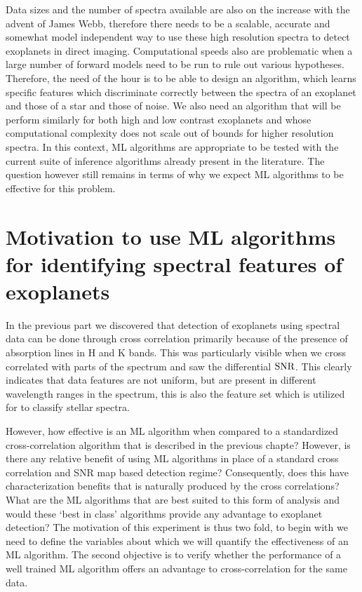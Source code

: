 Data sizes and the number of spectra available are also on the increase with the advent of James Webb, therefore there needs to be a scalable, accurate and somewhat model independent way to use these high resolution spectra to detect exoplanets in direct imaging.
Computational speeds also are problematic when a large number of forward models need to be run to rule out various hypotheses.
Therefore, the need of the hour is to be able to design an algorithm, which learns specific features which discriminate correctly between the spectra of an exoplanet and those of a star and those of noise.
We also need an algorithm that will be perform similarly for both high and low contrast exoplanets and whose computational complexity does not scale out of bounds for higher resolution spectra.
In this context, ML algorithms are appropriate to be tested with the current suite of inference algorithms already present in the literature.
The question however still remains in terms of why we expect ML algorithms to be effective for this problem.
\section{Motivation to use ML algorithms for identifying spectral features of exoplanets}
In the previous part we discovered that detection of exoplanets using spectral data can be done through cross correlation primarily because of the presence of absorption lines in H and K bands.
This was particularly visible when we cross correlated with parts of the spectrum and saw the differential $\rm{SNR}$.
This clearly indicates that data features are not uniform, but are present in different wavelength ranges in the spectrum, this is also the feature set which is utilized for \citep[for e.g ][]{2019Leung} to classify stellar spectra.

However, how effective is an ML algorithm when compared to a standardized cross-correlation algorithm that is described in the previous chapte?
However, is there any relative benefit of using ML algorithms in place of a standard cross correlation and SNR map based detection regime?
Consequently, does this have characterization benefits that is naturally produced by the cross correlations?
What are the ML algorithms that are best suited to this form of analysis and would these `best in class' algorithms provide any advantage to exoplanet detection?
The motivation of this experiment is thus two fold, to begin with we need to define the variables about which we will quantify the effectiveness of an ML algorithm.
The second objective is to verify whether the performance of a well trained ML algorithm offers an advantage to cross-correlation for the same data.

